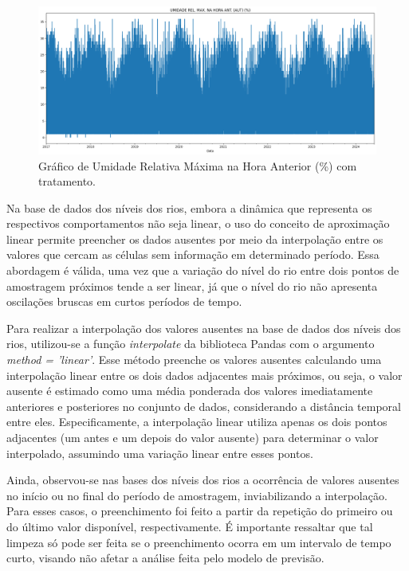 \begin{figure}[H]
	\caption{\label{fig:dados_outlier_com_tratamento}Gráfico de Umidade Relativa Máxima  na Hora Anterior (\%) com tratamento.}
	\begin{center}
		\includegraphics[scale=0.3]{figuras/UMIDADE REL. MAX. NA HORA ANT. (AUT) COM TRATAMENTO.png}
	\end{center}
\end{figure}

Na base de dados dos níveis dos rios, embora a dinâmica que representa os respectivos comportamentos não seja linear, o uso do conceito de aproximação linear permite preencher os dados ausentes por meio da interpolação entre os valores que cercam as células sem informação em determinado período. Essa abordagem é válida, uma vez que a variação do nível do rio entre dois pontos de amostragem próximos tende a ser linear, já que o nível do rio não apresenta oscilações bruscas em curtos períodos de tempo.

Para realizar a interpolação dos valores ausentes na base de dados dos níveis dos rios, utilizou-se a função \textit{interpolate} da biblioteca Pandas com o argumento \textit{method = 'linear'}. Esse método preenche os valores ausentes calculando uma interpolação linear entre os dois dados adjacentes mais próximos, ou seja, o valor ausente é estimado como uma média ponderada dos valores imediatamente anteriores e posteriores no conjunto de dados, considerando a distância temporal entre eles. Especificamente, a interpolação linear utiliza apenas os dois pontos adjacentes (um antes e um depois do valor ausente) para determinar o valor interpolado, assumindo uma variação linear entre esses pontos.

Ainda, observou-se nas bases dos níveis dos rios a ocorrência de valores ausentes no início ou no final do período de amostragem, inviabilizando a interpolação. Para esses casos, o preenchimento foi feito a partir da repetição do primeiro ou do último valor disponível, respectivamente. É importante ressaltar que tal limpeza só pode ser feita se o preenchimento ocorra em um intervalo de tempo curto, visando não afetar a análise feita pelo modelo de previsão.

